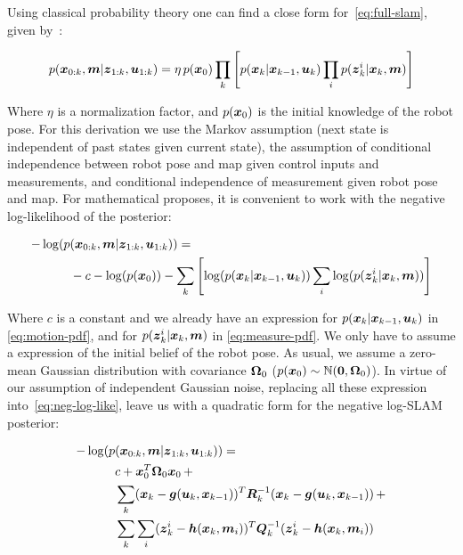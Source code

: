 Using classical probability theory one can find a close form for~\eqref{eq:full-slam}, given by~\cite{graphslam}: %

\begin{equation}
p(\boldsymbol{x}_{0:k},\boldsymbol{m}|\boldsymbol{z}_{1:k},\boldsymbol{u}_{1:k}) = 
\eta\, p(\boldsymbol{x}_0) \prod_{k}\left[ p(\boldsymbol{x}_k|\boldsymbol{x}_{k-1},\boldsymbol{u}_k)\prod_{i}p(\boldsymbol{z}_k^i|\boldsymbol{x}_k,\boldsymbol{m})\right] 
\label{eq:posterior}
\end{equation} 

\noindent
Where $\eta$ is a normalization factor, and $p(\boldsymbol{x}_0)$ is the initial knowledge of the robot pose. For this derivation we use the Markov assumption (next state is independent of past states given current state), the assumption of conditional independence between robot pose and map given control inputs and measurements, and conditional independence of measurement given robot pose and map. For mathematical proposes, it is convenient to work with the negative log-likelihood of the posterior:

\begin{equation}
\begin{split}
-\log(p&(\boldsymbol{x}_{0:k},\boldsymbol{m}|\boldsymbol{z}_{1:k},\boldsymbol{u}_{1:k})) =\\ 
&-c - \log(p(\boldsymbol{x}_0)) - \sum_{k}\left[ \log(p(\boldsymbol{x}_k|\boldsymbol{x}_{k-1},\boldsymbol{u}_k))\sum_{i}\log(p(\boldsymbol{z}_k^i|\boldsymbol{x}_k,\boldsymbol{m}))\right] 
\end{split}
\label{eq:neg-log-like}
\end{equation}

Where $c$ is a constant and we already have an expression for $p(\boldsymbol{x}_k|\boldsymbol{x}_{k-1},\boldsymbol{u}_k)$ in \eqref{eq:motion-pdf}, and for $p(\boldsymbol{z}_k^i|\boldsymbol{x}_k,\boldsymbol{m})$ in \eqref{eq:measure-pdf}. We only have to assume a expression of the initial belief of the robot pose. As usual, we assume a zero-mean Gaussian distribution with covariance $\boldsymbol{\Omega}_0$ ($p(\boldsymbol{x}_0)\sim\mathbb{N}(\boldsymbol{0},\boldsymbol{\Omega}_0)$). In virtue of our assumption of independent Gaussian noise, replacing all these expression into~\eqref{eq:neg-log-like}, leave us with a quadratic form for the negative log-SLAM posterior:

\begin{equation}
\begin{split}
-\log(p&(\boldsymbol{x}_{0:k},\boldsymbol{m}|\boldsymbol{z}_{1:k},\boldsymbol{u}_{1:k})) =\\ 
&c+\boldsymbol{x}_0^T \boldsymbol{\Omega}_0 \boldsymbol{x}_0\,+\\
&\sum_{k} (\boldsymbol{x}_k-\boldsymbol{g}(\boldsymbol{u}_k,\boldsymbol{x}_{k-1}))^T
\boldsymbol{R}_k^{-1}(\boldsymbol{x}_k-\boldsymbol{g}(\boldsymbol{u}_k,\boldsymbol{x}_{k-1}))\,+\\
&\sum_{k}\sum_{i}(\boldsymbol{z}_k^i-\boldsymbol{h}(\boldsymbol{x}_k,\boldsymbol{m}_i))^T
\boldsymbol{Q}_k^{-1}(\boldsymbol{z}_k^i-\boldsymbol{h}(\boldsymbol{x}_k,\boldsymbol{m}_i))
\label{eq:quadratic}
\end{split}
\end{equation}

